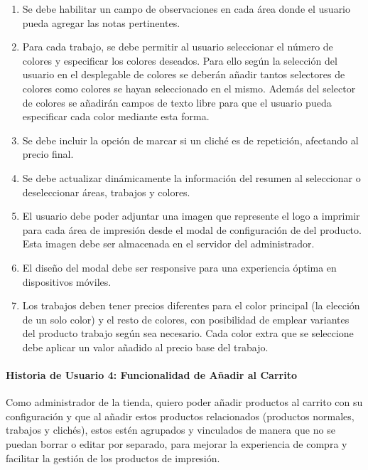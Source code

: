 \documentclass[12pt]{article}
\newcommand{\subsubsubsection}[1]{\paragraph{#1}}
\begin{document}
\begin{enumerate}[label=\arabic*.]
    \item Se debe habilitar un campo de observaciones en cada área donde el usuario pueda agregar las notas pertinentes.
    \item Para cada trabajo, se debe permitir al usuario seleccionar el número de colores y especificar los colores deseados. Para ello según la selección del usuario en el desplegable de colores se deberán añadir tantos selectores de colores como colores se hayan seleccionado en el mismo. Además del selector de colores se añadirán campos de texto libre para que el usuario pueda especificar cada color mediante esta forma.
    \item Se debe incluir la opción de marcar si un cliché es de repetición, afectando al precio final.
    \item Se debe actualizar dinámicamente la información del resumen al seleccionar o deseleccionar áreas, trabajos y colores.
    \item El usuario debe poder adjuntar una imagen que represente el logo a imprimir para cada área de impresión desde el modal de configuración de del producto. Esta imagen debe ser almacenada en el servidor del administrador.
    \item El diseño del modal debe ser responsive para una experiencia óptima en dispositivos móviles.
    \item Los trabajos deben tener precios diferentes para el color principal (la elección de un solo color) y el resto de colores, con posibilidad de emplear variantes del producto trabajo según sea necesario. Cada color extra que se seleccione debe aplicar un valor añadido al precio base del trabajo.
\end{enumerate}


\subsubsubsection{Historia de Usuario 4: Funcionalidad de Añadir al Carrito}\label{sec:historia4}

Como administrador de la tienda,
quiero poder añadir productos al carrito con su configuración y que al añadir estos productos relacionados (productos normales, trabajos y clichés), estos estén agrupados y vinculados de manera que no se puedan borrar o editar por separado,
para mejorar la experiencia de compra y facilitar la gestión de los productos de impresión.
\end{document}
